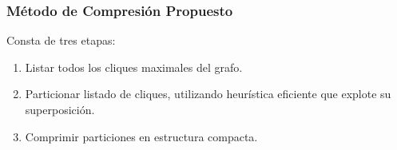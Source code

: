 \begin{frame}
\frametitle{Método de Compresión Propuesto}

Consta de tres etapas:

\begin{enumerate}
	\item Listar todos los cliques maximales del grafo.
	\item Particionar listado de cliques, utilizando heurística eficiente que explote su superposición.
	\item Comprimir particiones en estructura compacta.
\end{enumerate}

\end{frame}





%

